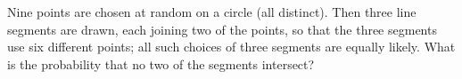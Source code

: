 Nine points are chosen at random on a circle (all distinct). Then three line segments are drawn, each joining two of the points, so that the three segments use six different points; all such choices of three segments are equally likely. What is the probability that no two of the segments intersect?
